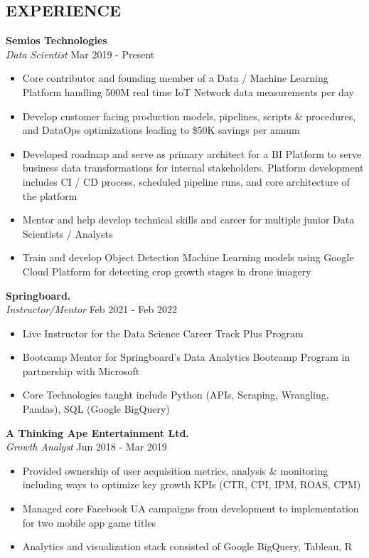 \documentclass[margin]{res}
\begin{document}
\begin{resume}

\section{EXPERIENCE}

\textbf{Semios Technologies }
    \\ {\sl Data Scientist} \hfill{Mar 2019 - Present} 

\begin{itemize}
  \item Core contributor and founding member of a Data / Machine Learning Platform handling 500M real time IoT Network data measurements per day
  \item Develop customer facing production models, pipelines, scripts & procedures, and DataOps optimizations leading to \$50K savings per annum
  \item Developed roadmap and serve as primary architect for a BI Platform to serve business data transformations for internal stakeholders. Platform development includes CI / CD process, scheduled pipeline runs, and core architecture of the platform
  \item Mentor and help develop technical skills and career for multiple junior Data Scientists / Analysts
  \item Train and develop Object Detection Machine Learning models using Google Cloud Platform for detecting crop growth stages in drone imagery
\end{itemize}

\textbf{Springboard.} 
    \\ {\sl Instructor/Mentor} \hfill{Feb 2021 - Feb 2022}
\begin{itemize}
    \item Live Instructor for the Data Science Career Track Plus Program
    \item Bootcamp Mentor for Springboard's Data Analytics Bootcamp Program in partnership with Microsoft
    \item Core Technologies taught include Python (APIs, Scraping, Wrangling, Pandas), SQL (Google BigQuery)
\end{itemize}

\textbf{A Thinking Ape Entertainment Ltd.} 
    \\ {\sl Growth Analyst} \hfill{Jun 2018 - Mar 2019}
\begin{itemize}
  \item Provided ownership of user acquisition metrics, analysis \& monitoring including ways to optimize key growth KPIs (CTR, CPI, IPM, ROAS, CPM)
  \item Managed core Facebook UA campaigns from development to implementation for two mobile app game titles
  \item Analytics and visualization stack consisted of Google BigQuery, Tableau, R
\end{itemize}


\end{resume}
\end{document}
